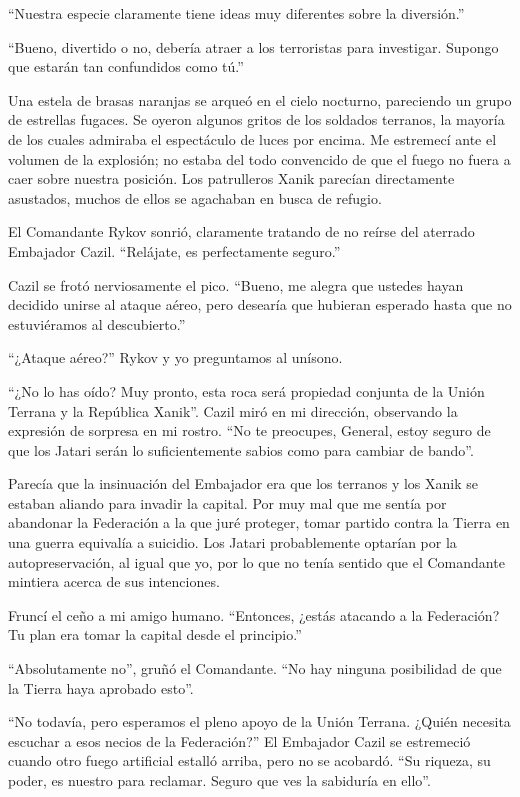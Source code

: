 \documentclass[spanish,12pt,a4paper,oneside,titlepage]{book}
\begin{document}
    ``Nuestra especie claramente tiene ideas muy diferentes sobre la diversión.''

    ``Bueno, divertido o no, debería atraer a los terroristas para investigar. Supongo que estarán tan confundidos como tú.''

    Una estela de brasas naranjas se arqueó en el cielo nocturno, pareciendo un grupo de estrellas fugaces. Se oyeron algunos gritos de los soldados terranos, la mayoría de los cuales admiraba el espectáculo de luces por encima. Me estremecí ante el volumen de la explosión; no estaba del todo convencido de que el fuego no fuera a caer sobre nuestra posición. Los patrulleros Xanik parecían directamente asustados, muchos de ellos se agachaban en busca de refugio.

    El Comandante Rykov sonrió, claramente tratando de no reírse del aterrado Embajador Cazil. ``Relájate, es perfectamente seguro.''

    Cazil se frotó nerviosamente el pico. ``Bueno, me alegra que ustedes hayan decidido unirse al ataque aéreo, pero desearía que hubieran esperado hasta que no estuviéramos al descubierto.''

    ``¿Ataque aéreo?'' Rykov y yo preguntamos al unísono.

    ``¿No lo has oído? Muy pronto, esta roca será propiedad conjunta de la Unión Terrana y la República Xanik''. Cazil miró en mi dirección, observando la expresión de sorpresa en mi rostro. ``No te preocupes, General, estoy seguro de que los Jatari serán lo suficientemente sabios como para cambiar de bando''.

    Parecía que la insinuación del Embajador era que los terranos y los Xanik se estaban aliando para invadir la capital. Por muy mal que me sentía por abandonar la Federación a la que juré proteger, tomar partido contra la Tierra en una guerra equivalía a suicidio. Los Jatari probablemente optarían por la autopreservación, al igual que yo, por lo que no tenía sentido que el Comandante mintiera acerca de sus intenciones.

    Fruncí el ceño a mi amigo humano. ``Entonces, ¿estás atacando a la Federación? Tu plan era tomar la capital desde el principio.''

    ``Absolutamente no'', gruñó el Comandante. ``No hay ninguna posibilidad de que la Tierra haya aprobado esto''.

    ``No todavía, pero esperamos el pleno apoyo de la Unión Terrana. ¿Quién necesita escuchar a esos necios de la Federación?'' El Embajador Cazil se estremeció cuando otro fuego artificial estalló arriba, pero no se acobardó. ``Su riqueza, su poder, es nuestro para reclamar. Seguro que ves la sabiduría en ello''.
\end{document}
